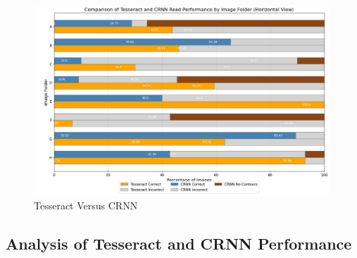 \vspace{1.5in}
\begin{figure}[ht]
    \centering
    \includegraphics[width=0.99\textwidth]{Figures/Results/tesseract_vs_crnn.png}
    \caption[Tesseract Versus CRNN]{Tesseract Versus CRNN}
    \label{fig:Tesseract Versus CRNN}
\end{figure}

\newpage


\subsection{Analysis of Tesseract and CRNN Performance}

